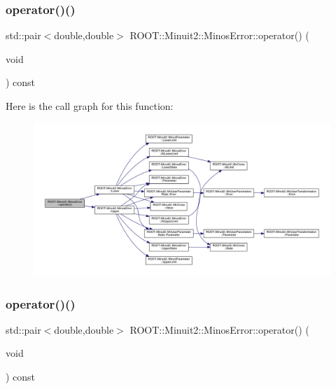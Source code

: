\mbox{\label{classROOT_1_1Minuit2_1_1MinosError_ae5c75a96400736de9741f6c5b8314e31}} 
\subsubsection{\texorpdfstring{operator()()}{operator()()}\hspace{0.1cm}{\footnotesize\ttfamily [4/6]}}
{\footnotesize\ttfamily std\+::pair$<$double,double$>$ R\+O\+O\+T\+::\+Minuit2\+::\+Minos\+Error\+::operator() (\begin{DoxyParamCaption}\item[{void}]{ }\end{DoxyParamCaption}) const\hspace{0.3cm}{\ttfamily [inline]}}

Here is the call graph for this function\+:
\nopagebreak
\begin{figure}[H]
\begin{center}
\leavevmode
\includegraphics[width=350pt]{d2/dd1/classROOT_1_1Minuit2_1_1MinosError_ae5c75a96400736de9741f6c5b8314e31_cgraph}
\end{center}
\end{figure}
\mbox{\label{classROOT_1_1Minuit2_1_1MinosError_ae5c75a96400736de9741f6c5b8314e31}} 
\subsubsection{\texorpdfstring{operator()()}{operator()()}\hspace{0.1cm}{\footnotesize\ttfamily [5/6]}}
{\footnotesize\ttfamily std\+::pair$<$double,double$>$ R\+O\+O\+T\+::\+Minuit2\+::\+Minos\+Error\+::operator() (\begin{DoxyParamCaption}\item[{void}]{ }\end{DoxyParamCaption}) const\hspace{0.3cm}{\ttfamily [inline]}}

